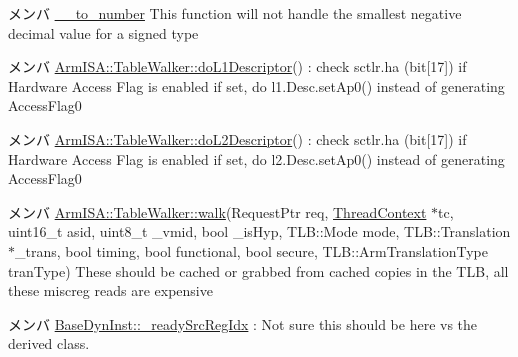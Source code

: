 \label{todo__todo000010}
\hypertarget{todo__todo000010}{}
 
\begin{DoxyDescription}
\item[メンバ \hyperlink{str_8cc_a62ee5dab740541c091921011e05068c7}{\_\-\_\-to\_\-number} ]This function will not handle the smallest negative decimal value for a signed type 
\end{DoxyDescription}

\label{todo__todo000003}
\hypertarget{todo__todo000003}{}
 
\begin{DoxyDescription}
\item[メンバ \hyperlink{classArmISA_1_1TableWalker_a837a539f5e07e8785902d5854efde98d}{ArmISA::TableWalker::doL1Descriptor}() ]: check sctlr.ha (bit\mbox{[}17\mbox{]}) if Hardware Access Flag is enabled if set, do l1.Desc.setAp0() instead of generating AccessFlag0 
\end{DoxyDescription}

\label{todo__todo000004}
\hypertarget{todo__todo000004}{}
 
\begin{DoxyDescription}
\item[メンバ \hyperlink{classArmISA_1_1TableWalker_a45b9877779ac070b7779f7e1eccdd05e}{ArmISA::TableWalker::doL2Descriptor}() ]: check sctlr.ha (bit\mbox{[}17\mbox{]}) if Hardware Access Flag is enabled if set, do l2.Desc.setAp0() instead of generating AccessFlag0 
\end{DoxyDescription}

\label{todo__todo000002}
\hypertarget{todo__todo000002}{}
 
\begin{DoxyDescription}
\item[メンバ \hyperlink{classArmISA_1_1TableWalker_ae5ef435aac9ac661f33937b2254718b1}{ArmISA::TableWalker::walk}(RequestPtr req, \hyperlink{classThreadContext}{ThreadContext} $\ast$tc, uint16\_\-t asid, uint8\_\-t \_\-vmid, bool \_\-isHyp, TLB::Mode mode, TLB::Translation $\ast$\_\-trans, bool timing, bool functional, bool secure, TLB::ArmTranslationType tranType) ]These should be cached or grabbed from cached copies in the TLB, all these miscreg reads are expensive 
\end{DoxyDescription}

\label{todo__todo000012}
\hypertarget{todo__todo000012}{}
 
\begin{DoxyDescription}
\item[メンバ \hyperlink{classBaseDynInst_a78a797b8c24ad873d0cbe5f52487b02f}{BaseDynInst::\_\-readySrcRegIdx} ]: Not sure this should be here vs the derived class. 
\end{DoxyDescription}

